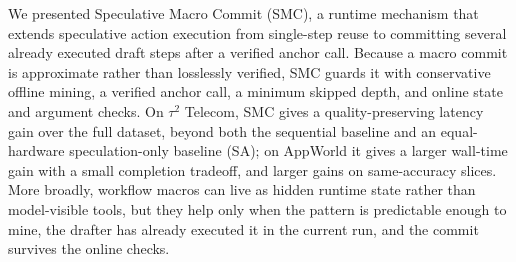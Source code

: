 
We presented Speculative Macro Commit (SMC), a runtime mechanism that extends speculative action execution from single-step reuse to committing several already executed draft steps after a verified anchor call. 
Because a macro commit is approximate rather than losslessly verified, SMC guards it with conservative offline mining, a verified anchor call, a minimum skipped depth, and online state and argument checks. 
On $\tau^2$ Telecom, SMC gives a quality-preserving latency gain over the full dataset, beyond both the sequential baseline and an equal-hardware speculation-only baseline (SA); on AppWorld it gives a larger wall-time gain with a small completion tradeoff, and larger gains on same-accuracy slices. 
More broadly, workflow macros can live as hidden runtime state rather than model-visible tools, but they help only when the pattern is predictable enough to mine, the drafter has already executed it in the current run, and the commit survives the online checks.
